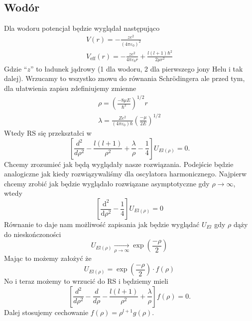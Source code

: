 \subsection{Wodór}
Dla wodoru potencjał będzie wyglądał następująco
\begin{equation*}
	\begin{gathered}
		V(r)=-\frac{z e^{2}}{\left(4 \pi \varepsilon_{0}\right)^2}\\
		V_{\text{eff}}(r) = -\frac{z e^2}{4 \pi \varepsilon_0 r} + \frac{l(l+1)\hbar^2}{2\mu r^2}
	\end{gathered}
\end{equation*}
Gdzie ``$z$'' to ładunek jądrowy (1 dla wodoru,
2 dla pierwszego jony Helu i tak dalej). Wrzucamy to wszystko znowu
do równania Schrödingera ale przed tym, dla ułatwienia zapisu zdefiniujemy zmienne
\begin{equation*}
	\begin{gathered}
		\rho=\left(\frac{-8\mu E}{\hbar^2}\right)^{1/2}r\\
		\lambda = \frac{Z e^2}{(4 \pi \varepsilon_0) \hbar} \left(\frac{-\mu}{2E}\right)^{1/2}
	\end{gathered}
\end{equation*}
Wtedy RS się przekształci w 
\begin{equation*}
	\left[\frac{d^{2}}{d \rho^{2}}-\frac{l(l+1)}{\rho^{2}}+\frac{\lambda}{\rho}-\frac{1}{4}\right]U_{El(\rho)}=0.
\end{equation*}
Chcemy zrozumieć jak będą wyglądały nasze rozwiązania. Podejście będzie analogiczne jak kiedy rozwiązywaliśmy dla oscylatora harmonicznego. Najpierw chcemy zrobić jak będzie wyglądało rozwiązane asymptotyczne gdy $\rho \to \infty$, wtedy 
\begin{equation*}
	\left[\frac{\text{d}^{2}}{\text{d} \rho^{2}}-\frac{1}{4}\right]U_{El(\rho)}=0
\end{equation*}
Równanie to daje nam możliwość zapisania jak będzie wyglądać $U_{El}$ gdy $\rho$ dąży do nieskończoności
\begin{equation*}
	U_{El(\rho)} \xrightarrow[\rho \to \infty]{} \exp(\frac{-\rho}{2})
\end{equation*}
Mając to możemy założyć że
\begin{equation*}
	U_{El(\rho)} = \exp(\frac{-\rho}{2}) \cdot f(\rho)
\end{equation*}
No i teraz możemy to wrzucić do RS i będziemy mieli
$$  \left[\frac{d^{2}}{d \rho^2}-\frac{d}{d \rho}-\frac{l(l+1)}{\rho^{2}}+\frac{\lambda}{\rho}\right] f(\rho)=0.  $$
Dalej stosujemy cechowanie $f(\rho) = \rho^{l+1}g(\rho)$.
